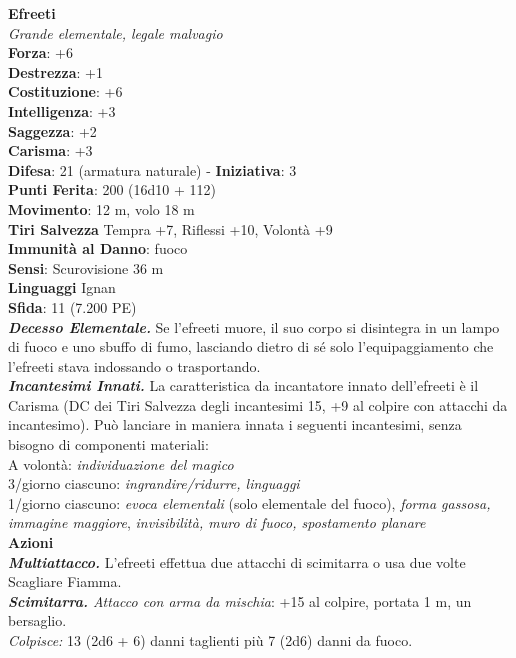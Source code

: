 \begin{multicols}{2}
\medskip\textbf{Efreeti}\\
\emph{Grande elementale, legale malvagio}\\
\textbf{Forza}: +6\\
\textbf{Destrezza}: +1\\
\textbf{Costituzione}: +6\\
\textbf{Intelligenza}: +3\\
\textbf{Saggezza}: +2\\
\textbf{Carisma}: +3\\
\textbf{Difesa}: 21 (armatura naturale) - \textbf{Iniziativa}: 3\\
\textbf{Punti Ferita}: 200 (16d10 + 112) \\
\textbf{Movimento}: 12 m, volo 18 m\\
\textbf{Tiri Salvezza} Tempra +7, Riflessi +10, Volontà +9\\
\textbf{Immunità al Danno}: fuoco\\
\textbf{Sensi}: Scurovisione 36 m\\
\textbf{Linguaggi} Ignan\\
\textbf{Sfida}: 11 (7.200 PE)\smallskip\\
\emph{\textbf{Decesso Elementale.}} Se l'efreeti muore, il suo corpo si disintegra in un lampo di fuoco e uno sbuffo di fumo, lasciando dietro di sé solo l'equipaggiamento che l'efreeti stava indossando o trasportando.\\
\emph{\textbf{Incantesimi Innati.}} La caratteristica da incantatore innato dell'efreeti è il Carisma (DC dei Tiri Salvezza degli incantesimi 15, +9 al colpire con attacchi da incantesimo). Può lanciare in maniera innata i seguenti incantesimi, senza bisogno di componenti materiali:\\
A volontà: \emph{individuazione del magico}\\
3/giorno ciascuno: \emph{ingrandire/ridurre, linguaggi}\\
1/giorno ciascuno: \emph{evoca elementali} (solo elementale del fuoco), \emph{forma gassosa, immagine maggiore}, \emph{invisibilità, muro di fuoco, spostamento planare}\\
\smallskip\textbf{Azioni}\\
\emph{\textbf{Multiattacco.}} L'efreeti effettua due attacchi di scimitarra o usa due volte Scagliare Fiamma.\\
\emph{\textbf{Scimitarra.} Attacco con arma da mischia}: +15 al colpire, portata 1 m, un bersaglio.\\
\emph{Colpisce:} 13 (2d6 + 6) danni taglienti più 7 (2d6) danni da fuoco.\\

\end{multicols}
